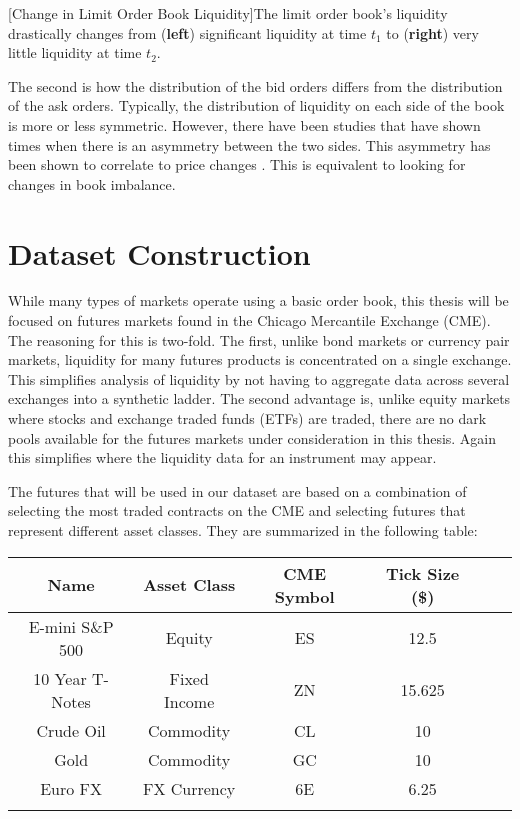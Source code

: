 \begin{center} 
[Change in Limit Order Book Liquidity]{The limit order book's liquidity drastically changes from (\textbf{left}) significant liquidity at time $t_1$ to (\textbf{right}) very little liquidity at time $t_2$.} 
\label{fig:book_img} 
\end{center}

The second is how the distribution of the bid orders differs from the distribution of the ask orders. Typically, the distribution of liquidity on each side of the book is more or less symmetric. However, there have been studies that have shown times when there is an asymmetry between the two sides. This asymmetry has been shown to correlate to price changes \cite{gould2016queue}. This is equivalent to looking for changes in book imbalance.


\section{Dataset Construction}

While many types of markets operate using a basic order book, this thesis will be focused on futures markets found in the Chicago Mercantile Exchange (CME). The reasoning for this is two-fold. The first, unlike bond markets or currency pair markets, liquidity for many futures products is concentrated on a single exchange. This simplifies analysis of liquidity by not having to aggregate data across several exchanges into a synthetic ladder. The second advantage is, unlike equity markets where stocks and exchange traded funds (ETFs) are traded, there are no dark pools available for the futures markets under consideration in this thesis. Again this simplifies where the liquidity data for an instrument may appear.

The futures that will be used in our dataset are based on a combination of selecting the most traded contracts on the CME and selecting futures that represent different asset classes. They are summarized in the following table:

\begin{center}
\begin{tabular}{SSSSSS} \toprule
    {Name} & {Asset Class} & {CME Symbol} & {Tick Size (\$)}\\ \midrule
    {E-mini S\&P 500}  & {Equity} & {ES} & 12.5  \\
    {10 Year T-Notes}  & {Fixed Income}  & {ZN} & 15.625   \\
    {Crude Oil}  & {Commodity}  & {CL} & 10    \\
    {Gold} & {Commodity}  & {GC} & 10   \\
    {Euro FX}  & {FX Currency}  & {6E} & 6.25  \\ \bottomrule
\label{futures}
\end{tabular}
\end{center}

